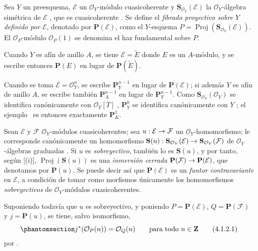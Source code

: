 \documentclass[oneside,10pt]{amsart}
\makeatletter
\newcommand{\ega@arrow}[2]{\mathchoice{#1}{#2}{#2}{#2}}
\renewcommand{\to}{\ega@arrow{\longrightarrow}{\rightarrow}}
\let\EGAOriginalLabel\label
\renewcommand{\label}[1]{\phantomsection\EGAOriginalLabel{#1}}
\makeatother
\begin{document}
\begin{definition}[4.1.1]
\label{II.4.1.1-fr}
Sea $Y$ un preesquema, $\mathcal{E}$ un $\mathcal{O}_Y$-módulo cuasicoherente y $\mathbf{S}_{\mathcal{O}_Y}(\mathcal{E})$ la $\mathcal{O}_Y$-álgebra simétrica de $\mathcal{E}$ , que es cuasicoherente .
Se define el \emph{fibrado proyectivo sobre $Y$ definido por $\mathcal{E}$}, denotado por $\mathbf{P}(\mathcal{E})$, como el $Y$-esquema $P=\operatorname{Proj}(\mathbf{S}_{\mathcal{O}_Y}(\mathcal{E}))$.
El $\mathcal{O}_P$-módulo $\mathcal{O}_P(1)$ se denomina el haz fundamental sobre $P$.
\end{definition}

Cuando $Y$ es afín de anillo $A$, se tiene $\mathcal{E}=\widetilde{E}$ donde $E$ es un $A$-módulo, y se escribe entonces $\mathbf{P}(E)$ en lugar de $\mathbf{P}(\widetilde{E})$.

Cuando se toma $\mathcal{E}=\mathcal{O}_Y^n$, se escribe $\mathbf{P}_Y^{n-1}$ en lugar de $\mathbf{P}(\mathcal{E})$;
si además $Y$ es afín de anillo $A$, se escribe también $\mathbf{P}_A^{n-1}$ en lugar de $\mathbf{P}_Y^{n-1}$.
Como $\mathbf{S}_{\mathcal{O}_Y}(\mathcal{O}_Y)$ se identifica canónicamente con $\mathcal{O}_Y[T]$ , $\mathbf{P}_Y^0$ se identifica canónicamente con $Y$ ;
el ejemplo~ es entonces exactamente $\mathbf{P}_K^1$.

\begin{env}[4.1.2]
\label{II.4.1.2-fr}
Sean $\mathcal{E}$ y $\mathcal{F}$ $\mathcal{O}_Y$-módulos cuasicoherentes;
sea $u:\mathcal{E}\to\mathcal{F}$ un $\mathcal{O}_Y$-homomorfismo;
le corresponde canónicamente un homomorfismo $\mathbf{S}(u):\mathbf{S}_{\mathcal{O}_Y}(\mathcal{E})\to
\mathbf{S}_{\mathcal{O}_Y}(\mathcal{F})$ de $\mathcal{O}_Y$-álgebras graduadas .
Si $u$ es \emph{sobreyectivo}, también lo es $\mathbf{S}(u)$, y por tanto, según [(i)], $\operatorname{Proj}(\mathbf{S}(u))$ es una \emph{inmersión cerrada} $\mathbf{P}(\mathcal{F})\to\mathbf{P}(\mathcal{E})$, que denotamos por $\mathbf{P}(u)$.
Se puede decir así que $\mathbf{P}(\mathcal{E})$ es un \emph{funtor contravariante} en $\mathcal{E}$, a condición de tomar como morfismos únicamente los homomorfismos \emph{sobreyectivos} de $\mathcal{O}_Y$-módulos cuasicoherentes.

Suponiendo todavía que $u$ es sobreyectivo, y poniendo $P=\mathbf{P}(\mathcal{E})$, $Q=\mathbf{P}(\mathcal{F})$ y $j=\mathbf{P}(u)$, se tiene, salvo isomorfismo,
\[
\label{II.4.1.2.1-fr}
  j^*(\mathcal{O}_P(n))=\mathcal{O}_Q(n)
  \qquad\text{para todo }n\in\mathbf{Z}
\tag{4.1.2.1}
\]
por .
\end{env}
\end{document}
